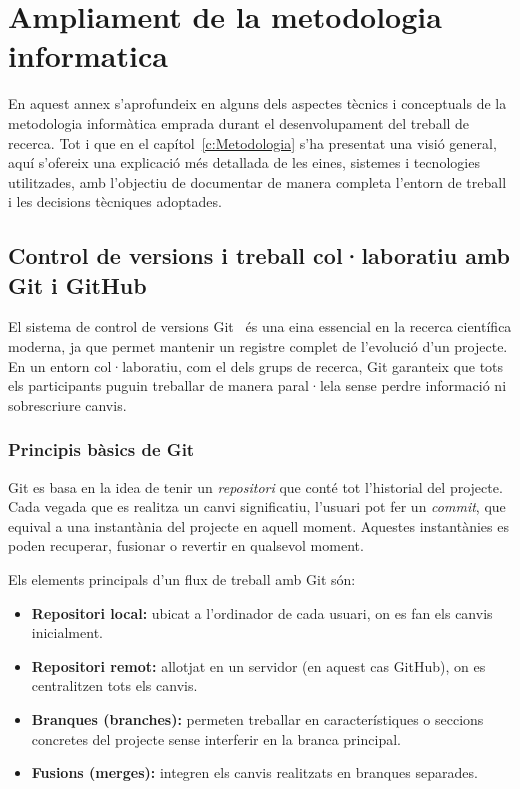 \chapter{Ampliament de la metodologia informatica}
\label{a:metodologia_informatica}

En aquest annex s’aprofundeix en alguns dels aspectes tècnics i conceptuals de la metodologia informàtica emprada durant el desenvolupament del treball de recerca. Tot i que en el capítol~\ref{c:Metodologia} s’ha presentat una visió general, aquí s’ofereix una explicació més detallada de les eines, sistemes i tecnologies utilitzades, amb l’objectiu de documentar de manera completa l’entorn de treball i les decisions tècniques adoptades.

\section{Control de versions i treball col·laboratiu amb Git i GitHub}
El sistema de control de versions Git~\cite{git} és una eina essencial en la recerca científica moderna, ja que permet mantenir un registre complet de l’evolució d’un projecte. En un entorn col·laboratiu, com el dels grups de recerca, Git garanteix que tots els participants puguin treballar de manera paral·lela sense perdre informació ni sobrescriure canvis.

\subsection{Principis bàsics de Git}
Git es basa en la idea de tenir un \textit{repositori} que conté tot l’historial del projecte. Cada vegada que es realitza un canvi significatiu, l’usuari pot fer un \textit{commit}, que equival a una instantània del projecte en aquell moment. Aquestes instantànies es poden recuperar, fusionar o revertir en qualsevol moment.

Els elements principals d’un flux de treball amb Git són:
\begin{itemize}
  \item \textbf{Repositori local:} ubicat a l’ordinador de cada usuari, on es fan els canvis inicialment.
  \item \textbf{Repositori remot:} allotjat en un servidor (en aquest cas GitHub), on es centralitzen tots els canvis.
  \item \textbf{Branques (branches):} permeten treballar en característiques o seccions concretes del projecte sense interferir en la branca principal.
  \item \textbf{Fusions (merges):} integren els canvis realitzats en branques separades.
\end{itemize}

